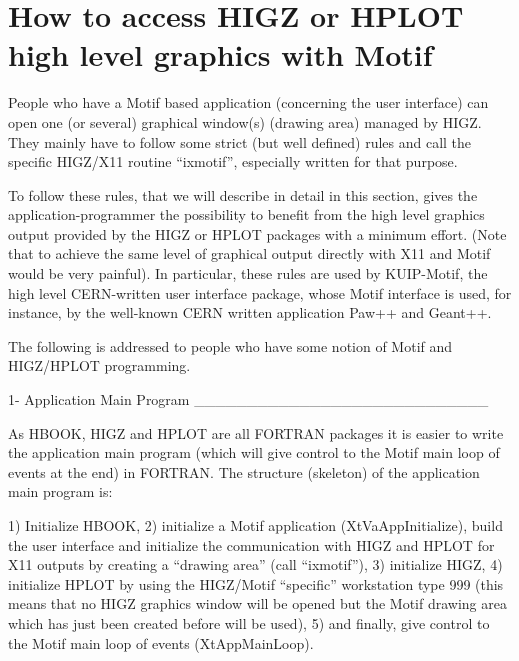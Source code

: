 \chapter{How to access HIGZ or HPLOT high level graphics with Motif}

People who have a Motif based application (concerning the user interface)
can open one (or several) graphical window(s) (drawing area) managed by
HIGZ. They mainly have to follow some strict (but well defined) rules and
call the specific HIGZ/X11 routine ``ixmotif'', especially written for
that purpose.

To follow these rules, that we will describe in detail in this section,
gives the application-programmer the possibility to benefit from the high
level graphics output provided by the HIGZ or HPLOT packages with a
minimum effort. (Note that to achieve the same level of graphical output
directly with X11 and Motif would be very painful). In particular, these
rules are used by KUIP-Motif, the high level CERN-written user interface
package, whose Motif interface is used, for instance, by the well-known
CERN written application Paw++ and Geant++.

The following is addressed to people who have some notion of Motif and
HIGZ/HPLOT programming.


1-  Application Main Program
____________________________

As HBOOK, HIGZ and HPLOT are all FORTRAN packages it is easier to write
the application main program (which will give control to the Motif main
loop of events at the end) in FORTRAN. The structure (skeleton) of the
application main program is:

1) Initialize HBOOK,
2) initialize a Motif application (XtVaAppInitialize), build the user
   interface and initialize the communication with HIGZ and HPLOT
   for X11 outputs by creating a ``drawing area'' (call ``ixmotif''),
3) initialize HIGZ,
4) initialize HPLOT by using the HIGZ/Motif ``specific'' workstation type
   999 (this means that no HIGZ graphics window will be opened but the
   Motif drawing area which has just been created before will be used),
5) and finally, give control to the Motif main loop of events
   (XtAppMainLoop).

